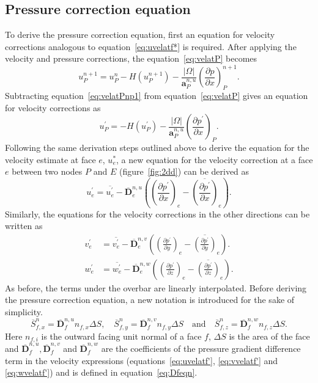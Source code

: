 \subsection{Pressure correction equation}
To derive the pressure correction equation, first an equation for velocity corrections analogous to equation~\ref{eq:uvelatf*} is required. After applying the velocity and pressure corrections, the equation~\ref{eq:velatP} becomes
\begin{equation}
u_{P}^{n+1} = u_{P}^n - H(u^{n+1}_P) - \frac{|\Omega|}{\mathbf{a}_{P}^{n,u}}\left(\frac{\partial p}{\partial x}\right)^{n+1}_{P}.
\label{eq:velatPnp1}
\end{equation}
Subtracting equation~\ref{eq:velatPnp1} from equation~\ref{eq:velatP} gives an equation for velocity corrections as
\begin{equation}
u_{P}^{\prime} = - H(u^{\prime}_P) - \frac{|\Omega|}{\mathbf{a}_{P}^{n,u}}\left(\frac{\partial p^{\prime}}{\partial x}\right)_{P}.
\label{eq:uvelatP'}
\end{equation}
Following the same derivation steps outlined above to derive the equation for the velocity estimate at face $e$, $u_e^{\ast}$, a new equation for the velocity correction at a face $e$ between two nodes $P$ and $E$ (figure~\ref{fig:2dd}) can be derived as
\begin{equation}
u_{e}^{\prime}=\overline{u_{e}^{\prime}}-\overline{\boldsymbol{D}}_{e}^{n,u}\left(\left(\frac{\partial p^{\prime}}{\partial x}\right)_{e}-\overline{\left(\frac{\partial p^{\prime}}{\partial x}\right)}_{e}\right).
\label{eq:uvelatf'}
\end{equation}
Similarly, the equations for the velocity corrections in the other directions can be written as
\begin{align}
v_{e}^{\prime}&=\overline{v_{e}^{\prime}}-\overline{\boldsymbol{D}}_{e}^{n,v}\left(\left(\frac{\partial p^{\prime}}{\partial y}\right)_{e}-\overline{\left(\frac{\partial p^{\prime}}{\partial y}\right)}_{e}\right).
\label{eq:vvelatf'}\\
w_{e}^{\prime}&=\overline{w_{e}^{\prime}}-\overline{\boldsymbol{D}}_{e}^{n,w}\left(\left(\frac{\partial p^{\prime}}{\partial z}\right)_{e}-\overline{\left(\frac{\partial p^{\prime}}{\partial z}\right)}_{e}\right).
\label{eq:wvelatf'}
\end{align}
As before, the terms under the overbar are linearly interpolated. Before deriving the pressure correction equation, a new notation is introduced for the sake of simplicity.
\begin{equation}
\overline{S}_{f,x}^{n} = \overline{\boldsymbol{D}}_{f}^{n,u} n_{f,x}\Delta S,\quad \overline{S}_{f,y}^{n} = \overline{\boldsymbol{D}}_{f}^{n,v} n_{f,y}\Delta S \quad\text{and} \quad \overline{S}_{f,z}^{n} = \overline{\boldsymbol{D}}_{f}^{n,w} n_{f,z}\Delta S.
\end{equation}
Here $n_{f,i}$ is the outward facing unit normal of a face $f$, $\Delta S$ is the area of the face and $\overline{\boldsymbol{D}}_{f}^{n,u}, \overline{\boldsymbol{D}}_{f}^{n,v}$ and $\overline{\boldsymbol{D}}_{f}^{n,w}$ are the coefficients of the pressure gradient difference term in the velocity expressions (equations~\ref{eq:uvelatf'}, \ref{eq:vvelatf'} and \ref{eq:wvelatf'}) and is defined in equation~\ref{eq:Dfeqn}.

